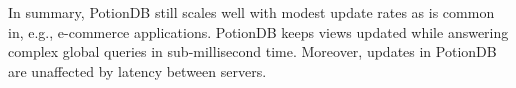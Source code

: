 \documentclass[sigconf, nonacm]{acmart}
\begin{document}
In summary, PotionDB still scales well with modest update rates as is common in, e.g., e-commerce applications.
PotionDB keeps views updated while answering complex global queries in sub-millisecond time.
Moreover, updates in PotionDB are unaffected by latency between servers.


%
%
%
%
%
%
\end{document}

